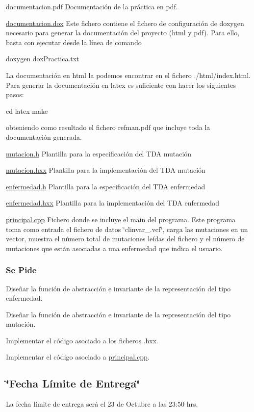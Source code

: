 \begin{DoxyItemize}
\item documentacion.\+pdf Documentación de la práctica en pdf. \item \hyperlink{documentacion_8dox}{documentacion.\+dox} Este fichero contiene el fichero de configuración de doxygen necesario para generar la documentación del proyecto (html y pdf). Para ello, basta con ejecutar desde la línea de comando 
\begin{DoxyCode}
doxygen doxPractica.txt
\end{DoxyCode}
 La documentación en html la podemos encontrar en el fichero ./html/index.html. Para generar la documentación en latex es suficiente con hacer los siguientes pasos\+: 
\begin{DoxyCode}
cd latex
make
\end{DoxyCode}
 obteniendo como resultado el fichero refman.\+pdf que incluye toda la documentación generada.\end{DoxyItemize}
\begin{DoxyItemize}
\item \hyperlink{mutacion_8h}{mutacion.\+h} Plantilla para la especificación del T\+DA mutación \item \hyperlink{mutacion_8hxx}{mutacion.\+hxx} Plantilla para la implementación del T\+DA mutación \item \hyperlink{enfermedad_8h}{enfermedad.\+h} Plantilla para la especificación del T\+DA enfermedad \item \hyperlink{enfermedad_8hxx}{enfermedad.\+hxx} Plantilla para la implementación del T\+DA enfermedad\end{DoxyItemize}
\begin{DoxyItemize}
\item \hyperlink{principal_8cpp}{principal.\+cpp} Fichero donde se incluye el main del programa. Este programa toma como entrada el fichero de datos \char`\"{}clinvar\+\_.\+vcf\char`\"{}, carga las mutaciones en un vector, muestra el número total de mutaciones leídas del fichero y el número de mutaciones que están asociadas a una enfermedad que indica el usuario.\end{DoxyItemize}
\hypertarget{index_ssPide}{}\subsubsection{Se Pide}\label{index_ssPide}
\begin{DoxyItemize}
\item Diseñar la función de abstracción e invariante de la representación del tipo enfermedad. \item Diseñar la función de abstracción e invariante de la representación del tipo mutación. \item Implementar el código asociado a los ficheros .hxx. \item Implementar el código asociado a \hyperlink{principal_8cpp}{principal.\+cpp}.\end{DoxyItemize}
\hypertarget{index_fecha}{}\subsection{\char`\"{}\+Fecha Límite de Entrega\char`\"{}}\label{index_fecha}
La fecha límite de entrega será el 23 de Octubre a las 23\+:50 hrs. 